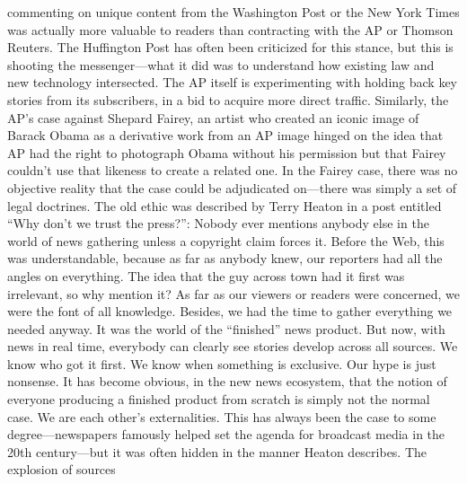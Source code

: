 commenting on unique content from the Washington Post or the New York
Times was actually more valuable to readers than contracting with the AP or
Thomson Reuters.
The Huffington Post has often been criticized for this stance, but this is shooting
the messenger—what it did was to understand how existing law and new
technology intersected. The AP itself is experimenting with holding back key
stories from its subscribers, in a bid to acquire more direct traffic. Similarly,
the AP’s case against Shepard Fairey, an artist who created an iconic image of
Barack Obama as a derivative work from an AP image hinged on the idea that
AP had the right to photograph Obama without his permission but that Fairey
couldn’t use that likeness to create a related one. In the Fairey case, there was
no objective reality that the case could be adjudicated on—there was simply a
set of legal doctrines.
The old ethic was described by Terry Heaton in a post entitled ``Why don’t we
trust the press?'':
Nobody ever mentions anybody else in the world of news gathering
unless a copyright claim forces it. Before the Web, this was understandable,
because as far as anybody knew, our reporters had all the
angles on everything. The idea that the guy across town had it first
was irrelevant, so why mention it? As far as our viewers or readers
were concerned, we were the font of all knowledge. Besides, we had
the time to gather everything we needed anyway. It was the world of
the ``finished'' news product.
But now, with news in real time, everybody can clearly see stories
develop across all sources. We know who got it first. We know when
something is exclusive. Our hype is just nonsense.
It has become obvious, in the new news ecosystem, that the notion of everyone
producing a finished product from scratch is simply not the normal case. We are
each other’s externalities. This has always been the case to some degree—newspapers
famously helped set the agenda for broadcast media in the 20th century—but
it was often hidden in the manner Heaton describes. The explosion of sources

